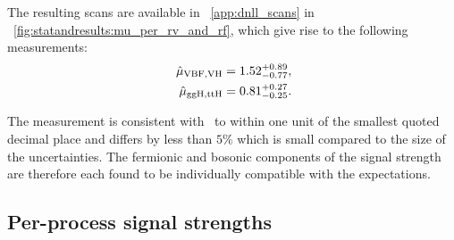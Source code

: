 The resulting scans are available in \App~\ref{app:dnll_scans} in \Fig~\ref{fig:statandresults:mu_per_rv_and_rf}, which give rise to the following measurements:
\begin{equation*}
\begin{split}
\,\hat{\mu}_{\text{VBF},\text{VH}} = 1.52^{+0.89}_{-0.77}, \\
\,\hat{\mu}_{\text{ggH},\text{ttH}} = 0.81^{+0.27}_{-0.25}.
\end{split}
\end{equation*}

The \muF measurement is consistent with~\cite{CMS-PAS-HIG-16-020} to within one unit of the smallest quoted decimal place and \muV differs by less than $5\%$ which is small compared to the size of the uncertainties. The fermionic and bosonic components of the signal strength are therefore each found to be individually compatible with the \SM expectations. %


\subsection{Per-process signal strengths}
\label{sec:statandresults:mu_per_proc}

